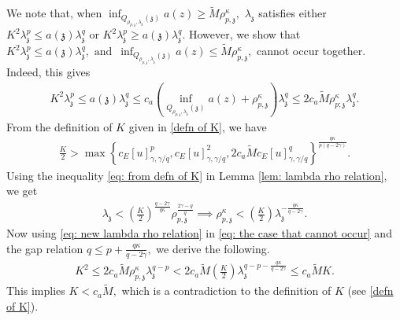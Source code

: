 \documentclass[notitlepage,11pt,reqno]{amsart}
\theoremstyle{definition}
\numberwithin{equation}{section}
\begin{document}
We note that, when $\inf_{Q_{\rho_{p; \mathfrak z}, \lambda_{\mathfrak z}}(\mathfrak z)}a(z)\geq \widetilde M\rho^{\kappa}_{p, \mathfrak{z}},$ $\lambda_{\mathfrak z}$ satisfies either $K^2\lambda_{\mathfrak z}^{p}\le a(\mathfrak z)\lambda_{\mathfrak z}^{q}$ or $K^2\lambda_{\mathfrak z}^{p}\ge a(\mathfrak z)\lambda_{\mathfrak z}^{q}.$  However, we show that $K^2\lambda_{\mathfrak{z}}^p \leq a(\mathfrak{z})\lambda_{\mathfrak{z}}^q,\,\, \text{and}\,\,\,  \inf_{Q_{\rho_{p; \mathfrak z}, \lambda_{\mathfrak z}}(\mathfrak z)}a(z)\leq \widetilde M\rho^{\kappa}_{p, \mathfrak{z}},$  cannot occur together. Indeed, this gives
\begin{align}\label{eq: the case that cannot occur}
    K^2\lambda^p_{\mathfrak{z}} \leq a(\mathfrak{z})\lambda^q_{\mathfrak{z}} \leq c_a\left(\inf_{Q_{\rho_{p; \mathfrak z}, \lambda_{\mathfrak z}}(\mathfrak z)}a(z)+\rho^{\kappa}_{p, \mathfrak z}\right)\lambda^q_{\mathfrak z}\leq 2c_a \widetilde M\rho^{\kappa}_{p; \mathfrak{z}}\lambda^q_{\mathfrak{z}}.
\end{align}
From the definition of $K$ given in \eqref{defn of K}, we have
\begin{align}\label{eq: from defn of K}
    \frac{K}{2}> \max\left\{c_E[u]^p_{\gamma, \gamma/q}, c_E[u]^2_{\gamma, \gamma/ q}, 2c_a\widetilde Mc_E[u]^q_{\gamma, \gamma/ q}\right\}^{\frac{q\kappa}{p(q-2\gamma)}}.
\end{align}
Using the inequality \eqref{eq: from defn of K} in Lemma \ref{lem: lambda rho relation}, we get
\begin{align}\label{eq: new lambda rho relation}
    \lambda_{\mathfrak{z}}< \left(\frac{K}{2}\right)^{\frac{q-2\gamma}{q\kappa}}\rho^{\frac{2\gamma-q}{q}}_{p, \mathfrak{z}}\implies \rho^{\kappa}_{p, \mathfrak{z}}< \left(\frac{K}{2}\right)\lambda^{-\frac{q\kappa}{q-2\gamma}}_{\mathfrak z}.
\end{align}
Now using \eqref{eq: new lambda rho relation} in \eqref{eq: the case that cannot occur} and the gap relation $q\leq p+\frac{q\kappa}{q-2\gamma},$ we derive the following.
\begin{align*}
    K^2\leq 2c_a \widetilde M\rho^{\kappa}_{p, \mathfrak{z}}\lambda^{q-p}_{\mathfrak{z}}< 2c_a\widetilde M\left(\frac{K}{2}\right)\lambda^{q-p-\frac{q\kappa}{q-2\gamma}}_{\mathfrak{z}}\leq c_a\widetilde MK.
\end{align*}
This implies $K<c_a \widetilde M,$ which is a contradiction to the definition of $K$ (see \eqref{defn of K}).
\end{document}

